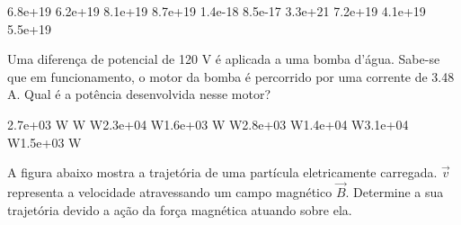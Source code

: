 \documentclass[12pt, addpoints]{exam}
\begin{document}
\begin{questions}
\begin{multicols*}{2}
\begin{oneparchoices}
\choice 6.8e+19 \choice 6.2e+19 \choice 8.1e+19 \choice 8.7e+19 \choice 1.4e-18 \choice 8.5e-17 \choice 3.3e+21 \choice 7.2e+19 \choice 4.1e+19 \choice 5.5e+19 
\end{oneparchoices}\question Uma diferença de potencial de 120 V é aplicada a uma bomba d’água. Sabe-se que em funcionamento, o motor da bomba é percorrido por uma corrente de    3.48 A. Qual é a potência desenvolvida nesse motor?

\begin{oneparchoices}
\choice 2.7e+03 W W W\choice 2.3e+04 W\choice 1.6e+03 W W\choice 2.8e+03 W\choice 1.4e+04 W\choice 3.1e+04 W\choice 1.5e+03 W
\end{oneparchoices}\question A ﬁgura abaixo mostra a trajetória de uma partícula eletricamente carregada. $\vec{{v}}$ representa a velocidade atravessando um campo magnético $\vec{{B}}$. Determine a sua trajetória devido a ação da força magnética atuando sobre ela.
        
        \begin{center}
            \begin{minipage}[c]{0.5\linewidth}
            \end{minipage}
        \end{center}

        


\end{multicols*}
\end{questions}
\end{document}

